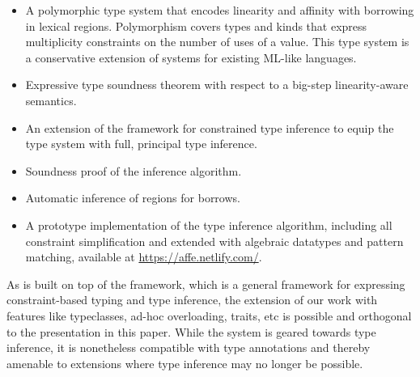 \begin{itemize}
\item A polymorphic type system that encodes linearity and affinity with
  borrowing in lexical regions. Polymorphism covers types and kinds that
  express multiplicity constraints on the number of uses of a
  value. This type system is a conservative extension of systems for
  existing ML-like languages.
\item Expressive type soundness theorem with respect to a big-step linearity-aware semantics.
\item An extension of the \hmx framework
  \cite{DBLP:journals/tapos/OderskySW99} for constrained type
  inference to equip the type system with full, principal type inference.
\item Soundness proof of the inference algorithm.
\item Automatic inference of regions for borrows.
\item A prototype implementation of the type inference algorithm, including all
  constraint simplification and extended with algebraic datatypes and
  pattern matching,
  available at \url{https://affe.netlify.com/}.
\end{itemize}

As \lang{} is built on top of the \hmx{} framework, which is a general
framework for expressing constraint-based typing and type inference,
the extension of our work with features like typeclasses, ad-hoc overloading,
traits, etc is possible and orthogonal to the presentation in this paper.
While the system is geared towards type inference, it is nonetheless
compatible with type annotations and thereby amenable to extensions
where type inference may no longer be possible.

